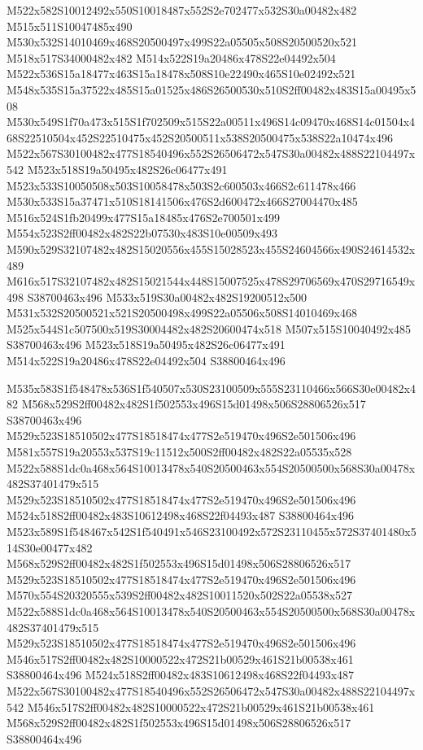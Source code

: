 \documentclass{article}
\begin{document}
\begin{multicols}{2}
M522x582S10012492x550S10018487x552S2e702477x532S30a00482x482 M515x511S10047485x490 M530x532S14010469x468S20500497x499S22a05505x508S20500520x521 M518x517S34000482x482 M514x522S19a20486x478S22e04492x504 M522x536S15a18477x463S15a18478x508S10e22490x465S10e02492x521 M548x535S15a37522x485S15a01525x486S26500530x510S2ff00482x483S15a00495x508 M530x549S1f70a473x515S1f702509x515S22a00511x496S14c09470x468S14c01504x468S22510504x452S22510475x452S20500511x538S20500475x538S22a10474x496 M522x567S30100482x477S18540496x552S26506472x547S30a00482x488S22104497x542 M523x518S19a50495x482S26c06477x491 M523x533S10050508x503S10058478x503S2c600503x466S2c611478x466 M530x533S15a37471x510S18141506x476S2d600472x466S27004470x485 M516x524S1fb20499x477S15a18485x476S2e700501x499 M554x523S2ff00482x482S22b07530x483S10e00509x493 M590x529S32107482x482S15020556x455S15028523x455S24604566x490S24614532x489 M616x517S32107482x482S15021544x448S15007525x478S29706569x470S29716549x498 S38700463x496 M533x519S30a00482x482S19200512x500 M531x532S20500521x521S20500498x499S22a05506x508S14010469x468 M525x544S1c507500x519S30004482x482S20600474x518 M507x515S10040492x485 S38700463x496 M523x518S19a50495x482S26c06477x491 M514x522S19a20486x478S22e04492x504 S38800464x496

M535x583S1f548478x536S1f540507x530S23100509x555S23110466x566S30e00482x482 M568x529S2ff00482x482S1f502553x496S15d01498x506S28806526x517 S38700463x496 M529x523S18510502x477S18518474x477S2e519470x496S2e501506x496 M581x557S19a20553x537S19c11512x500S2ff00482x482S22a05535x528 M522x588S1dc0a468x564S10013478x540S20500463x554S20500500x568S30a00478x482S37401479x515 M529x523S18510502x477S18518474x477S2e519470x496S2e501506x496 M524x518S2ff00482x483S10612498x468S22f04493x487 S38800464x496 M523x589S1f548467x542S1f540491x546S23100492x572S23110455x572S37401480x514S30e00477x482 M568x529S2ff00482x482S1f502553x496S15d01498x506S28806526x517 M529x523S18510502x477S18518474x477S2e519470x496S2e501506x496 M570x554S20320555x539S2ff00482x482S10011520x502S22a05538x527 M522x588S1dc0a468x564S10013478x540S20500463x554S20500500x568S30a00478x482S37401479x515 M529x523S18510502x477S18518474x477S2e519470x496S2e501506x496 M546x517S2ff00482x482S10000522x472S21b00529x461S21b00538x461 S38800464x496 M524x518S2ff00482x483S10612498x468S22f04493x487 M522x567S30100482x477S18540496x552S26506472x547S30a00482x488S22104497x542 M546x517S2ff00482x482S10000522x472S21b00529x461S21b00538x461 M568x529S2ff00482x482S1f502553x496S15d01498x506S28806526x517 S38800464x496


\end{multicols}
\end{document}
